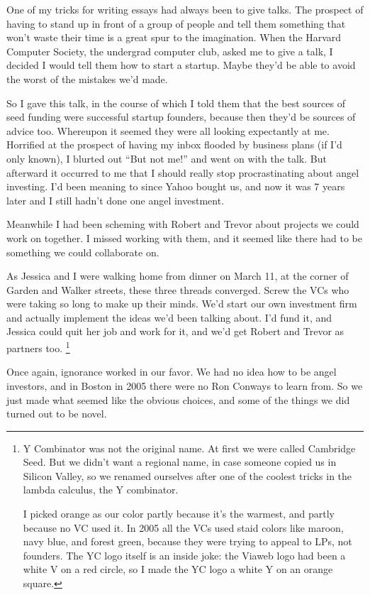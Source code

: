 One of my tricks for writing essays had always been to give talks. The
prospect of having to stand up in front of a group of people and tell
them something that won't waste their time is a great spur to the
imagination. When the Harvard Computer Society, the undergrad computer
club, asked me to give a talk, I decided I would tell them how to start
a startup. Maybe they'd be able to avoid the worst of the mistakes we'd
made.

So I gave this talk, in the course of which I told them that the best
sources of seed funding were successful startup founders, because then
they'd be sources of advice too. Whereupon it seemed they were all
looking expectantly at me. Horrified at the prospect of having my inbox
flooded by business plans (if I'd only known), I blurted out ``But not
me!'' and went on with the talk. But afterward it occurred to me that I
should really stop procrastinating about angel investing. I'd been
meaning to since Yahoo bought us, and now it was 7 years later and I
still hadn't done one angel investment.

Meanwhile I had been scheming with Robert and Trevor about projects we
could work on together. I missed working with them, and it seemed like
there had to be something we could collaborate on.

As Jessica and I were walking home from dinner on March 11, at the
corner of Garden and Walker streets, these three threads converged.
Screw the VCs who were taking so long to make up their minds. We'd start
our own investment firm and actually implement the ideas we'd been
talking about. I'd fund it, and Jessica could quit her job and work for
it, and we'd get Robert and Trevor as partners too.
\footnote{Y Combinator was not the original name. At first we were called
Cambridge Seed. But we didn't want a regional name, in case someone
copied us in Silicon Valley, so we renamed ourselves after one of the
coolest tricks in the lambda calculus, the Y combinator.

I picked orange as our color partly because it's the warmest, and partly
because no VC used it. In 2005 all the VCs used staid colors like
maroon, navy blue, and forest green, because they were trying to appeal
to LPs, not founders. The YC logo itself is an inside joke: the Viaweb
logo had been a white V on a red circle, so I made the YC logo a white Y
on an orange square.}

Once again, ignorance worked in our favor. We had no idea how to be
angel investors, and in Boston in 2005 there were no Ron Conways to
learn from. So we just made what seemed like the obvious choices, and
some of the things we did turned out to be novel.


